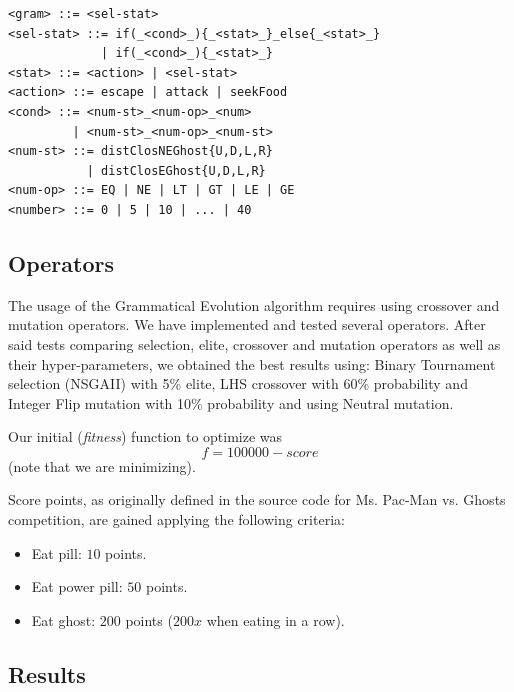 \documentclass{llncs}
\newcommand{\pacman}{Ms. Pac-Man vs. Ghosts }
\begin{document}
\begin{lstlisting}[frame=single, caption=high-level grammar, breaklines=true, basicstyle=\fontsize{10}{11}\ttfamily]
<gram> ::= <sel-stat>
<sel-stat> ::= if(_<cond>_){_<stat>_}_else{_<stat>_}
             | if(_<cond>_){_<stat>_}
<stat> ::= <action> | <sel-stat>
<action> ::= escape | attack | seekFood
<cond> ::= <num-st>_<num-op>_<num>
         | <num-st>_<num-op>_<num-st>
<num-st> ::= distClosNEGhost{U,D,L,R}
           | distClosEGhost{U,D,L,R}
<num-op> ::= EQ | NE | LT | GT | LE | GE
<number> ::= 0 | 5 | 10 | ... | 40
\end{lstlisting} %

\subsection{Operators}
The usage of the Grammatical Evolution algorithm requires using crossover and mutation operators. We have implemented and tested several operators. After said tests comparing selection, elite, crossover and mutation operators as well as their hyper-parameters, we obtained the best results using: Binary Tournament selection (NSGAII) with 5\% elite, LHS crossover\cite{harper_blair_2005} with 60\% probability and Integer Flip mutation with 10\% probability and using Neutral mutation\cite{oesch_maringer_2014}.

\hfill

Our initial (\textit{fitness}) function to optimize was
\begin{equation} %
f = 100000 - score
\end{equation}
(note that we are minimizing).

Score points, as originally defined in the source code for \pacman competition, are gained applying the following criteria:
\begin{itemize}
\label{vanilla_pacman_score}
\item Eat pill: $10$ points.
\item Eat power pill: $50$ points.
\item Eat ghost: $200$ points ($200x$ when eating in a row).
\end{itemize}

\subsection{Results}
\end{document}
